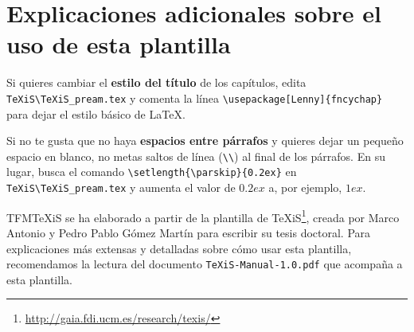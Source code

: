 \section{Explicaciones adicionales sobre el uso de esta plantilla}
Si quieres cambiar el \textbf{estilo del título} de los capítulos, edita \verb|TeXiS\TeXiS_pream.tex| y comenta la línea \verb|\usepackage[Lenny]{fncychap}| para dejar el estilo básico de \LaTeX.

Si no te gusta que no haya \textbf{espacios entre párrafos} y quieres dejar un pequeño espacio en blanco, no metas saltos de línea (\verb|\\|) al final de los párrafos. En su lugar, busca el comando  \verb|\setlength{\parskip}{0.2ex}| en \verb|TeXiS\TeXiS_pream.tex| y aumenta el valor de $0.2ex$ a, por ejemplo, $1ex$.

TFMTeXiS se ha elaborado a partir de la plantilla de TeXiS\footnote{\url{http://gaia.fdi.ucm.es/research/texis/}}, creada por Marco Antonio y Pedro Pablo Gómez Martín para escribir su tesis doctoral. Para explicaciones más extensas y detalladas sobre cómo usar esta plantilla, recomendamos la lectura del documento \texttt{TeXiS-Manual-1.0.pdf} que acompaña a esta plantilla.

